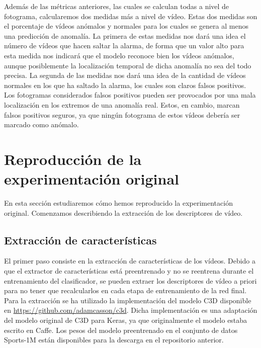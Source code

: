 \documentclass[../main.tex]{memoir}
\begin{document}
Además de las métricas anteriores, las cuales se calculan todas a
nivel de fotograma, calcularemos dos medidas más a nivel de
vídeo. Estas dos medidas son el porcentaje de vídeos anómalos y
normales para los cuales se genera al menos una predicción de
anomalía. La primera de estas medidas nos dará una idea el número de
vídeos que hacen saltar la alarma, de forma que un valor alto para
esta medida nos indicará que el modelo reconoce bien los vídeos
anómalos, aunque posiblemente la localización temporal de dicha
anomalía no sea del todo precisa. La segunda de las medidas nos dará
una idea de la cantidad de vídeos normales en los que ha saltado la
alarma, los cuales son claros falsos positivos. Los fotogramas
considerados falsos positivos pueden ser provocados por una mala
localización en los extremos de una anomalía real. Estos, en cambio,
marcan falsos positivos seguros, ya que ningún fotograma de estos
vídeos debería ser marcado como anómalo.

\section{Reproducción de la experimentación original}

En esta sección estudiaremos cómo hemos reproducido la experimentación
original. Comenzamos describiendo la extracción de los descriptores de
vídeo.

\subsection{Extracción de características}

El primer paso consiste en la extracción de características de los
vídeos. Debido a que el extractor de características está preentrenado
y no se reentrena durante el entrenamiento del clasificador, se pueden
extraer los descriptores de vídeo a priori para no tener que
recalcularlos en cada etapa de entrenamiento de la red final.\\

Para la extracción se ha utilizado la implementación del modelo C3D
disponible en \url{https://github.com/adamcasson/c3d}. Dicha
implementación es una adaptación del modelo original de C3D
\cite{tran2015learning} para Keras, ya que originalmente el modelo
estaba escrito en Caffe. Los pesos del modelo preentrenado en el
conjunto de datos Sports-1M están disponibles para la descarga en el
repositorio anterior.\\
\end{document}
